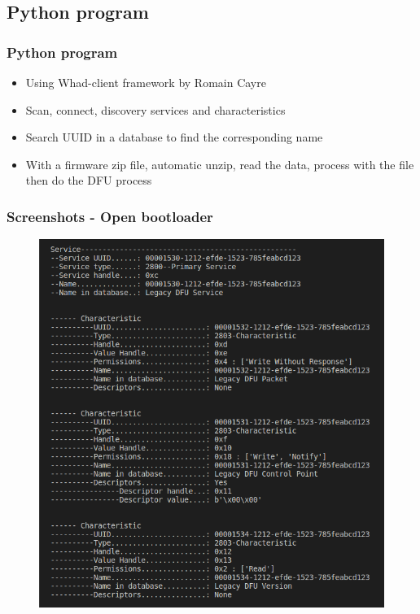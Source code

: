 \documentclass[34pt]{beamer}
\begin{document}
	\subsection{Python program}
	\begin{frame}
		\frametitle{Python program}
		\begin{itemize}
			\item Using Whad-client framework by Romain Cayre
			\vspace{1cm}
			\item Scan, connect, discovery services and characteristics
			\vspace{1cm}
			\item Search UUID in a database to find the corresponding name
			\vspace{1cm}
			\item With a firmware zip file, automatic unzip, read the data, process with the file then do the DFU process
		\end{itemize}

	\end{frame}
	\begin{frame}
		\frametitle{Screenshots - Open bootloader}
	\begin{figure}[H]
		\centering
		\includegraphics[width=0.64\linewidth]{../project_Report/images/gatt-open}
	\end{figure}
	\end{frame}	
\end{document}
